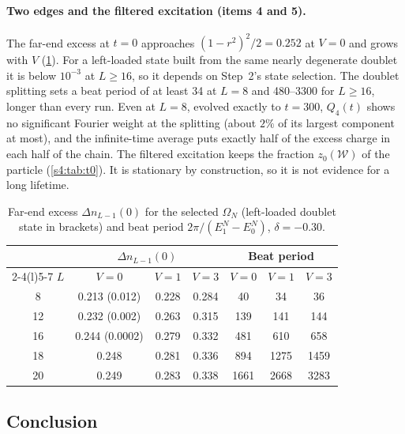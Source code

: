 \documentclass[11pt,a4paper]{article}
\newcommand{\Om}{\Omega_N}
\newcommand{\Wcal}{\mathcal{W}}
\begin{document}
\paragraph{Two edges and the filtered excitation (items 4 and 5).} The far-end excess at $t=0$ approaches $(1-r^2)^2/2=0.252$ at $V=0$ and grows with $V$ (\cref{s4:tab:edges}). For a left-loaded state built from the same nearly degenerate doublet it is below $10^{-3}$ at $L\ge16$, so it depends on Step~2's state selection. The doublet splitting sets a beat period of at least 34 at $L=8$ and 480--3300 for $L\ge16$, longer than every run. Even at $L=8$, evolved exactly to $t=300$, $Q_4(t)$ shows no significant Fourier weight at the splitting (about $2\%$ of its largest component at most), and the infinite-time average puts exactly half of the excess charge in each half of the chain. The filtered excitation keeps the fraction $z_0(\Wcal)$ of the particle (\cref{s4:tab:t0}). It is stationary by construction, so it is not evidence for a long lifetime.

\begin{table}[htbp]
\centering\small
\caption{Far-end excess $\Delta n_{L-1}(0)$ for the selected $\Om$ (left-loaded doublet state in brackets) and beat period $2\pi/(E_1^N-E_0^N)$, $\delta=-0.30$.}
\label{s4:tab:edges}
\begin{tabular}{@{}c ccc ccc@{}}
\toprule
 & \multicolumn{3}{c}{$\Delta n_{L-1}(0)$} & \multicolumn{3}{c}{Beat period}\\
\cmidrule(lr){2-4}\cmidrule(l){5-7}
$L$ & $V=0$ & $V=1$ & $V=3$ & $V=0$ & $V=1$ & $V=3$\\
\midrule
8  & 0.213 (0.012) & 0.228 & 0.284 & 40   & 34   & 36\\
12 & 0.232 (0.002) & 0.263 & 0.315 & 139  & 141  & 144\\
16 & 0.244 (0.0002) & 0.279 & 0.332 & 481  & 610  & 658\\
18 & 0.248 & 0.281 & 0.336 & 894  & 1275 & 1459\\
20 & 0.249 & 0.283 & 0.338 & 1661 & 2668 & 3283\\
\bottomrule
\end{tabular}
\end{table}

\subsection{Conclusion}
\end{document}
